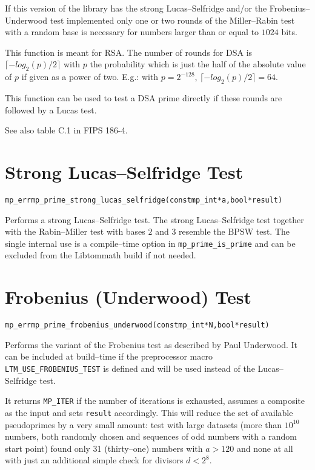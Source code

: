 \documentclass[synpaper]{book}
\begin{document}
If this version of the library has the strong Lucas--Selfridge and/or the Frobenius--Underwood test
implemented only one or two rounds of the Miller--Rabin test with a random base is necessary for
numbers larger than or equal to $1024$ bits.

This function is meant for RSA. The number of rounds for DSA is $\lceil -log_2(p)/2\rceil$ with $p$
the probability which is just the half of the absolute value of $p$ if given as a power of two.
E.g.: with $p = 2^{-128}$, $\lceil -log_2(p)/2\rceil = 64$.

This function can be used to test a DSA prime directly if these rounds are followed by a Lucas
test.

See also table C.1 in FIPS 186-4.

\section{Strong Lucas--Selfridge Test}
\begin{alltt}
mp_err mp_prime_strong_lucas_selfridge(const mp_int *a, bool *result)
\end{alltt}
Performs a strong Lucas--Selfridge test. The strong Lucas--Selfridge test together with the
Rabin--Miller test with bases $2$ and $3$ resemble the BPSW test. The single internal use is a
compile--time option in \texttt{mp\_prime\_is\_prime} and can be excluded from the Libtommath build
if not needed.

\section{Frobenius (Underwood)	Test}
\begin{alltt}
mp_err mp_prime_frobenius_underwood(const mp_int *N, bool *result)
\end{alltt}
Performs the variant of the Frobenius test as described by Paul Underwood. It can be included at
build--time if the preprocessor macro \texttt{LTM\_USE\_FROBENIUS\_TEST} is defined and will be
used
instead of the Lucas--Selfridge test.

It returns \texttt{MP\_ITER} if the number of iterations is exhausted, assumes a composite as the
input and sets \texttt{result} accordingly. This will reduce the set of available pseudoprimes by a
very small amount: test with large datasets (more than $10^{10}$ numbers, both randomly chosen and
sequences of odd numbers with a random start point) found only 31 (thirty--one) numbers with $a >
  120$ and none at all with just an additional simple check for divisors $d < 2^8$.
\end{document}
